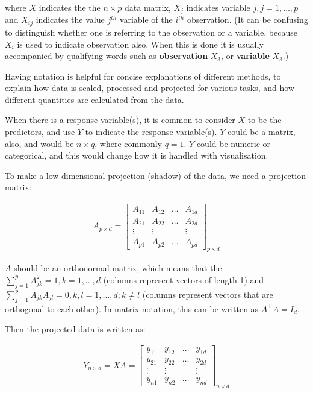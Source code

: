 \documentclass[
  letterpaper,
]{krantz}
\begin{document}
where \(X\) indicates the the \(n\times p\) data matrix, \(X_j\)
indicates variable \(j, j=1, \dots, p\) and \(X_{ij}\) indicates the
value \(j^{th}\) variable of the \(i^{th}\) observation. (It can be
confusing to distinguish whether one is referring to the observation or
a variable, because \(X_i\) is used to indicate observation also. When
this is done it is usually accompanied by qualifying words such as
\textbf{observation} \(X_3\), or \textbf{variable} \(X_3\).)

Having notation is helpful for concise explanations of different
methods, to explain how data is scaled, processed and projected for
various tasks, and how different quantities are calculated from the
data.

When there is a response variable(s), it is common to consider \(X\) to
be the predictors, and use \(Y\) to indicate the response variable(s).
\(Y\) could be a matrix, also, and would be \(n\times q\), where
commonly \(q=1\). \(Y\) could be numeric or categorical, and this would
change how it is handled with visualisation.

To make a low-dimensional projection (shadow) of the data, we need a
projection matrix:

\begin{eqnarray*}
A_{p\times d} = \left[ \begin{array}{cccc}
A_{11} & A_{12} & \dots & A_{1d} \\
A_{21} & A_{22} & \dots & A_{2d}\\
\vdots & \vdots &  & \vdots \\
A_{p1} & A_{p2} & \dots & A_{pd} \end{array} \right]_{p\times d}
\end{eqnarray*}

\(A\) should be an orthonormal matrix, which means that the
\(\sum_{j=1}^p A_{jk}^2=1, k=1, \dots, d\) (columns represent vectors of
length 1) and \(\sum_{j=1}^p A_{jk}A_{jl}=0, k,l=1, \dots, d; k\neq l\)
(columns represent vectors that are orthogonal to each other). In matrix
notation, this can be written as \(A^{\top}A = I_d\).

Then the projected data is written as:

\begin{eqnarray*}
Y_{n\times d} = XA = \left[ \begin{array}{cccc}
y_{11} & y_{12} & \dots & y_{1d} \\
y_{21} & y_{22} & \dots & y_{2d}\\
\vdots & \vdots &  & \vdots \\
y_{n1} & y_{n2} & \dots & y_{nd} \end{array} \right]_{n\times d}
\end{eqnarray*}
\end{document}
